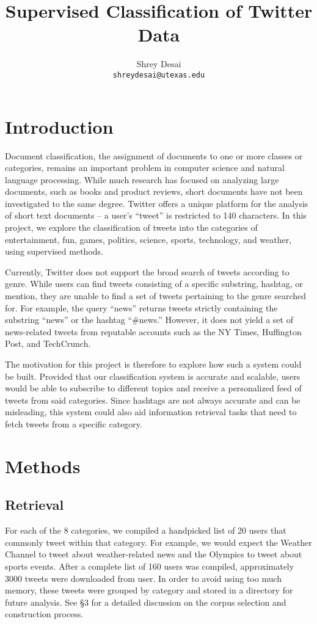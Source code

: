 \documentclass[twocolumn]{article}
\title{\textbf{Supervised Classification of Twitter Data}}
\author{
    Shrey Desai \\
    \texttt{shreydesai@utexas.edu}
}
\date{}
\begin{document}
\maketitle

\section{Introduction}

Document classification, the assignment of documents to one or more classes or categories, remains an important problem in computer science and natural language processing. While much research has focused on analyzing large documents, such as books and product reviews, short documents have not been investigated to the same degree. Twitter offers a unique platform for the analysis of short text documents -- a user’s “tweet” is restricted to 140 characters. In this project, we explore the classification of tweets into the categories of entertainment, fun, games, politics, science, sports, technology, and weather, using supervised methods.

Currently, Twitter does not support the broad search of tweets according to genre. While users can find tweets consisting of a specific substring, hashtag, or mention, they are unable to find a set of tweets pertaining to the genre searched for. For example, the query ``news'' returns tweets strictly containing the substring ``news'' or the hashtag ``\#news.'' However, it does not yield a set of news-related tweets from reputable accounts such as the NY Times, Huffington Post, and TechCrunch.

The motivation for this project is therefore to explore how such a system could be built. Provided that our classification system is accurate and scalable, users would be able to subscribe to different topics and receive a personalized feed of tweets from said categories. Since hashtags are not always accurate and can be misleading, this system could also aid information retrieval tasks that need to fetch tweets from a specific category.

\section{Methods}

\subsection{Retrieval}

For each of the 8 categories, we compiled a handpicked list of 20 users that commonly tweet within that category. For example, we would expect the Weather Channel to tweet about weather-related news and the Olympics to tweet about sports events. After a complete list of 160 users was compiled, approximately 3000 tweets were downloaded from user. In order to avoid using too much memory, these tweets were grouped by category and stored in a directory for future analysis. See \S{3} for a detailed discussion on the corpus selection and construction process.
\end{document}
